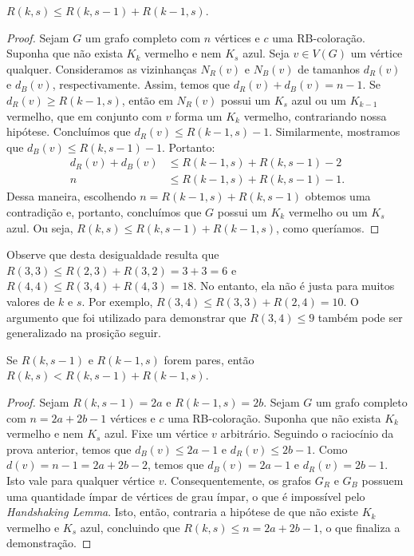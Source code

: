 \begin{theorem}
\label{prelim:thm:inequality}
$R(k,s) \leq R(k,s-1) + R(k-1,s)$.
\end{theorem}
\begin{proof}
Sejam $G$ um grafo completo com $n$ vértices e $c$ uma RB-coloração. Suponha que não exista $K_k$ vermelho e nem $K_s$ azul. Seja $v \in V(G)$ um vértice qualquer. Consideramos as vizinhanças $N_R(v)$ e $N_B(v)$ de tamanhos $d_R(v)$ e $d_B(v)$, respectivamente. Assim, temos que $d_R(v) + d_B(v) = n-1$. Se $d_R(v) \geq R(k-1,s)$, então em $N_R(v)$ possui um $K_s$ azul ou um $K_{k-1}$ vermelho, que em conjunto com $v$ forma um $K_k$ vermelho, contrariando nossa hipótese. Concluímos que $d_R(v) \leq R(k-1,s) - 1$. Similarmente, mostramos que $d_B(v) \leq R(k,s-1) - 1$. Portanto:
\begin{align*}
d_R(v) + d_B(v) &\leq R(k-1,s) + R(k,s-1) - 2 \\
n &\leq R(k-1,s) + R(k,s-1) - 1.
\end{align*}
Dessa maneira, escolhendo $n = R(k-1,s) + R(k,s-1)$ obtemos uma contradição e, portanto, concluímos que $G$ possui um $K_k$ vermelho ou um $K_s$ azul. Ou seja, $R(k,s) \leq R(k,s-1) + R(k-1,s)$, como queríamos.
\end{proof}

Observe que desta desigualdade resulta que $R(3,3) \leq R(2,3) + R(3,2) = 3 + 3 = 6$ e $R(4,4) \leq R(3,4) + R(4,3) = 18$. No entanto, ela não é justa para muitos valores de $k$ e $s$. Por exemplo, $R(3,4) \leq R(3,3) + R(2,4) = 10$. O argumento que foi utilizado para demonstrar que $R(3,4) \leq 9$ também pode ser generalizado na prosição seguir.

\begin{theorem}
\label{prelim:thm:parity}
Se $R(k,s-1)$ e $R(k-1,s)$ forem pares, então
$R(k,s) < R(k,s-1) + R(k-1,s)$.
\end{theorem}
\begin{proof}
Sejam $R(k,s-1) = 2a$ e $R(k-1,s) = 2b$.
Sejam $G$ um grafo completo com $n = 2a + 2b -1$ vértices e $c$ uma RB-coloração. Suponha que não exista $K_k$ vermelho e nem $K_s$ azul. Fixe um vértice $v$ arbitrário. Seguindo o raciocínio da prova anterior, temos que $d_B(v) \leq 2a - 1$ e $d_R(v) \leq 2b - 1$. Como $d(v) = n - 1 = 2a + 2b - 2$, temos que $d_B(v) = 2a - 1$ e $d_R(v) = 2b - 1$. Isto vale para qualquer vértice $v$.
Consequentemente, os grafos $G_R$ e $G_B$ possuem uma quantidade ímpar de vértices de grau ímpar, o que é impossível pelo \emph{Handshaking Lemma}. Isto, então, contraria a hipótese de que não existe $K_k$ vermelho e $K_s$ azul, concluindo que $R(k,s) \leq n = 2a + 2b -1$, o que finaliza a demonstração.
\end{proof}

